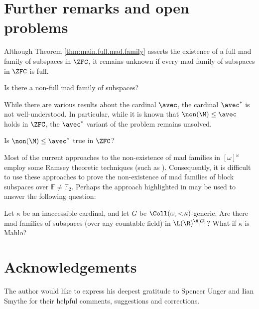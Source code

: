 \documentclass[11pt,reqno]{amsart}
\begin{document}
\section{Further remarks and open problems}
\label{sec:conclusion}
Although Theorem \ref{thm:main.full.mad.family} asserts the existence of a full mad family of subspaces in $\ZFC$, it remains unknown if every mad family of subspaces in $\ZFC$ is full.

\begin{prob}
    Is there a non-full mad family of subspaces?
\end{prob}

While there are various results about the cardinal $\avec$, the cardinal $\avec^*$ is not well-understood. In particular, while it is known that $\non(\M) \leq \avec$ holds in $\ZFC$, the $\avec^*$ variant of the problem remains unsolved.

\begin{prob}
    Is $\non(\M) \leq \avec^*$ true in $\ZFC$?
\end{prob}

Most of the current approaches to the non-existence of mad families in $[\omega]^\omega$ employ some Ramsey theoretic techniques (such as \cite{M77} \cite{NN18} \cite{ST19}). Consequently, it is difficult to use these approaches to prove the non-existence of mad families of block subspaces over $\mathbb{F} \neq \mathbb{F}_2$. Perhaps the approach highlighted in \cite{T18} may be used to answer the following question:

\begin{prob}
    Let $\kappa$ be an inaccessible cardinal, and let $G$ be $\Coll(\omega,<\!\kappa)$-generic. Are there mad families of subspaces (over any countable field) in $\L(\R)^{\V[G]}$? What if $\kappa$ is Mahlo?
\end{prob}

\section*{Acknowledgements}
The author would like to express his deepest gratitude to Spencer Unger and Iian Smythe for their helpful comments, suggestions and corrections.

\printbibliography[heading=bibintoc,title={References}]
\end{document}
